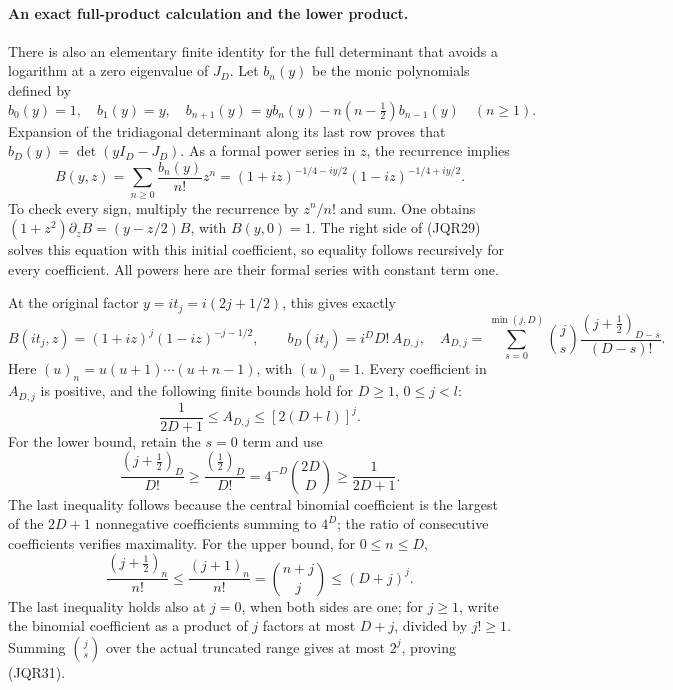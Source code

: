 \documentclass[11pt,a4paper]{article}
\begin{document}
\paragraph{An exact full-product calculation and the lower product.}
There is also an elementary finite identity for the full determinant
that avoids a logarithm at a zero eigenvalue of \(J_D\).
Let \(b_n(y)\) be the monic polynomials defined by
\[
 b_0(y)=1,\quad b_1(y)=y,\quad
 b_{n+1}(y)=y b_n(y)-n(n-\tfrac12)b_{n-1}(y)\quad(n\geq1).
 \tag{JQR28}
\]
Expansion of the tridiagonal determinant along its last row proves
that \(b_D(y)=\det(yI_D-J_D)\).  As a formal power series in \(z\),
the recurrence implies
\[
 B(y,z)=\sum_{n\geq0}\frac{b_n(y)}{n!}z^n
  =(1+iz)^{-1/4-iy/2}(1-iz)^{-1/4+iy/2}.
 \tag{JQR29}
\]
To check every sign, multiply the recurrence by \(z^n/n!\) and
sum.  One obtains
\((1+z^2)\partial_z B=(y-z/2)B\), with \(B(y,0)=1\).
The right side of (JQR29) solves this equation with this initial
coefficient, so equality follows recursively for every coefficient.
All powers here are their formal series with constant term one.

At the original factor \(y=it_j=i(2j+1/2)\), this gives exactly
\[
 B(it_j,z)=(1+iz)^j(1-iz)^{-j-1/2},\qquad
 b_D(it_j)=i^D D!\,A_{D,j},
 \quad
 A_{D,j}=\sum_{s=0}^{\min(j,D)}
   \binom js\frac{(j+\tfrac12)_{D-s}}{(D-s)!}.
 \tag{JQR30}
\]
Here \((u)_n=u(u+1)\cdots(u+n-1)\), with \((u)_0=1\).
Every coefficient in \(A_{D,j}\) is positive, and the following
finite bounds hold for \(D\geq1\), \(0\leq j<l\):
\[
 \frac1{2D+1}\leq A_{D,j}\leq[2(D+l)]^j.
 \tag{JQR31}
\]
For the lower bound, retain the \(s=0\) term and use
\[
 \frac{(j+\tfrac12)_D}{D!}\geq
 \frac{(\tfrac12)_D}{D!}
 =4^{-D}\binom{2D}{D}\geq\frac1{2D+1}.
 \tag{JQR32}
\]
The last inequality follows because the central binomial coefficient
is the largest of the \(2D+1\) nonnegative coefficients summing to
\(4^D\); the ratio of consecutive coefficients verifies maximality.
For the upper bound, for \(0\leq n\leq D\),
\[
 \frac{(j+\tfrac12)_n}{n!}
 \leq\frac{(j+1)_n}{n!}=\binom{n+j}{j}
 \leq(D+j)^j.
 \tag{JQR33}
\]
The last inequality holds also at \(j=0\), when both sides are one;
for \(j\geq1\), write the binomial coefficient as a product of \(j\)
factors at most \(D+j\), divided by \(j!\geq1\).
Summing \(\binom js\) over the actual truncated range gives at most
\(2^j\), proving (JQR31).
\end{document}
